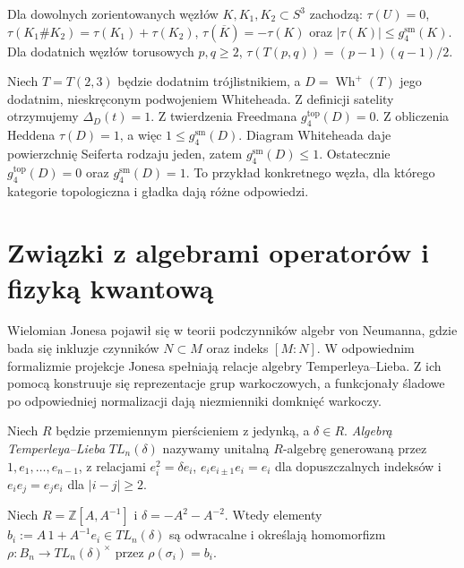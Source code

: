 \begin{twierdzenie}
Dla dowolnych zorientowanych węzłów $K,K_1,K_2\subset S^3$
zachodzą:
$\tau(U)=0$,
$\tau(K_1\#K_2)=\tau(K_1)+\tau(K_2)$,
$\tau(\overline K)=-\tau(K)$ oraz
$|\tau(K)|\leq g_4^{\mathrm{sm}}(K)$.
Dla dodatnich węzłów torusowych $p,q\geq2$,
$\tau(T(p,q))=(p-1)(q-1)/2$.
\end{twierdzenie}

\begin{przyklad}
Niech $T=T(2,3)$ będzie dodatnim trójlistnikiem,
a $D=\operatorname{Wh}^{+}(T)$ jego dodatnim,
nieskręconym podwojeniem Whiteheada. Z definicji
satelity otrzymujemy $\Delta_D(t)=1$.
Z twierdzenia Freedmana $g_4^{\mathrm{top}}(D)=0$.
Z obliczenia Heddena $\tau(D)=1$, a więc
$1\leq g_4^{\mathrm{sm}}(D)$. Diagram Whiteheada daje
powierzchnię Seiferta rodzaju jeden, zatem
$g_4^{\mathrm{sm}}(D)\leq1$.
Ostatecznie
$g_4^{\mathrm{top}}(D)=0$ oraz $g_4^{\mathrm{sm}}(D)=1$.
To przykład konkretnego węzła, dla którego kategorie
topologiczna i gładka dają różne odpowiedzi.
\end{przyklad}

\section{Związki z algebrami operatorów i fizyką kwantową}
\label{sec:kt-operator}

Wielomian Jonesa pojawił się w teorii podczynników algebr
von Neumanna, gdzie bada się inkluzje czynników
$N\subset M$ oraz indeks $[M:N]$. W odpowiednim
formalizmie projekcje Jonesa spełniają relacje
algebry Temperleya--Lieba. Z ich pomocą konstruuje się
reprezentacje grup warkoczowych, a funkcjonały śladowe
po odpowiedniej normalizacji dają niezmienniki domknięć
warkoczy.

\begin{definicja}
Niech $R$ będzie przemiennym pierścieniem z jedynką,
a $\delta\in R$. \emph{Algebrą Temperleya--Lieba}
$TL_n(\delta)$ nazywamy unitalną $R$-algebrę generowaną
przez $1,e_1,\dots,e_{n-1}$, z relacjami
$e_i^2=\delta e_i$,
$e_ie_{i\pm1}e_i=e_i$ dla dopuszczalnych indeksów
i $e_ie_j=e_je_i$ dla $|i-j|\geq2$.
\end{definicja}

\begin{stwierdzenie}
Niech $R=\mathbb Z[A,A^{-1}]$ i $\delta=-A^2-A^{-2}$.
Wtedy elementy $b_i:=A\,1+A^{-1}e_i\in TL_n(\delta)$
są odwracalne i określają homomorfizm
$\rho\colon B_n\to TL_n(\delta)^\times$ przez
$\rho(\sigma_i)=b_i$.
\end{stwierdzenie}

